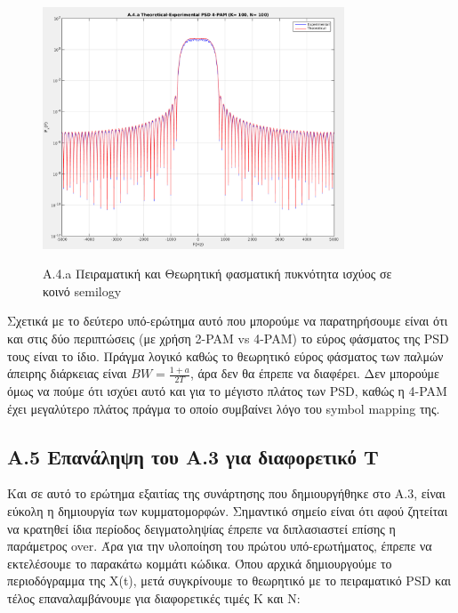 \documentclass[11pt]{article}
\begin{document}
      \begin{figure}[H]
        \centering
        \includegraphics[scale=0.5, width=0.8\textwidth]{figures/A4.1-T_E_PSD.png} \\
        \caption{A.4.a Πειραματική και Θεωρητική φασματική πυκνότητα ισχύος σε κοινό semilogy}
    \end{figure}
    
    
    \par \noindent
    Σχετικά με το δεύτερο υπό-ερώτημα αυτό που μπορούμε να παρατηρήσουμε είναι ότι και στις δύο περιπτώσεις (με χρήση 2-PAM vs 4-PAM) το εύρος φάσματος της PSD τους είναι το ίδιο.
    Πράγμα λογικό καθώς το θεωρητικό εύρος φάσματος των παλμών άπειρης διάρκειας είναι $BW=\frac{1+a}{2T}$, άρα δεν θα έπρεπε να διαφέρει.
    Δεν μπορούμε όμως να πούμε ότι ισχύει αυτό και για το μέγιστο πλάτος των PSD, καθώς η 4-PAM έχει μεγαλύτερο πλάτος πράγμα το οποίο συμβαίνει λόγο του symbol mapping της.
    
    
    
    \subsection*{A.5 Επανάληψη του Α.3 για διαφορετικό T}
    Και σε αυτό το ερώτημα εξαιτίας της συνάρτησης που δημιουργήθηκε στο Α.3, είναι εύκολη η δημιουργία των κυμματομορφών.
    Σημαντικό σημείο είναι ότι αφού ζητείται να κρατηθεί ίδια περίοδος δειγματοληψίας έπρεπε να διπλασιαστεί επίσης η παράμετρος over. 
    Άρα για την υλοποίηση του πρώτου υπό-ερωτήματος, έπρεπε να εκτελέσουμε το παρακάτω κομμάτι κώδικα. Όπου αρχικά δημιουργούμε το περιοδόγραμμα της X(t), μετά συγκρίνουμε το θεωρητικό με το πειραματικό PSD και τέλος επαναλαμβάνουμε για διαφορετικές τιμές Κ και Ν:
    
\end{document}
